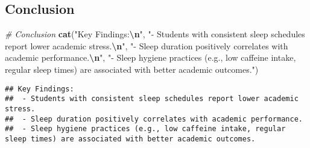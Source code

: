 \documentclass[
]{article}
\newenvironment{Shaded}{\begin{snugshade}}{\end{snugshade}}
\newcommand{\CommentTok}[1]{\textcolor[rgb]{0.56,0.35,0.01}{\textit{#1}}}
\newcommand{\FunctionTok}[1]{\textcolor[rgb]{0.13,0.29,0.53}{\textbf{#1}}}
\newcommand{\NormalTok}[1]{#1}
\newcommand{\SpecialCharTok}[1]{\textcolor[rgb]{0.81,0.36,0.00}{\textbf{#1}}}
\newcommand{\StringTok}[1]{\textcolor[rgb]{0.31,0.60,0.02}{#1}}
\begin{document}
\subsection{Conclusion}\label{conclusion}

\begin{Shaded}
\begin{Highlighting}[]
\CommentTok{\# Conclusion}
\FunctionTok{cat}\NormalTok{(}\StringTok{"Key Findings:}\SpecialCharTok{\textbackslash{}n}\StringTok{"}\NormalTok{,}
    \StringTok{"{-} Students with consistent sleep schedules report lower academic stress.}\SpecialCharTok{\textbackslash{}n}\StringTok{"}\NormalTok{,}
    \StringTok{"{-} Sleep duration positively correlates with academic performance.}\SpecialCharTok{\textbackslash{}n}\StringTok{"}\NormalTok{,}
    \StringTok{"{-} Sleep hygiene practices (e.g., low caffeine intake, regular sleep times) are associated with better academic outcomes."}\NormalTok{)}
\end{Highlighting}
\end{Shaded}

\begin{verbatim}
## Key Findings:
##  - Students with consistent sleep schedules report lower academic stress.
##  - Sleep duration positively correlates with academic performance.
##  - Sleep hygiene practices (e.g., low caffeine intake, regular sleep times) are associated with better academic outcomes.
\end{verbatim}
\end{document}
